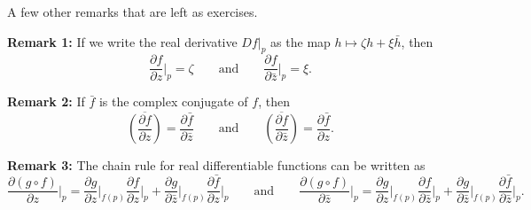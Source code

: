\documentclass[10pt,aspectratio=169]{beamer}
\begin{document}
\begin{frame}
A few other remarks that are left as exercises.

\medskip
\pause
\textbf{Remark 1:}
If we write the real derivative $Df|_p$ as the map $h \mapsto \zeta h + \xi \bar{h}$,
\pause
then
\[
\frac{\partial f}{\partial z}\big|_p = \zeta
\qquad \text{and} \qquad
\frac{\partial f}{\partial \bar{z}}\big|_p = \xi .
\]

\medskip
\pause
\textbf{Remark 2:}
If $\bar{f}$ is the complex conjugate of $f$, then
\pause
\[
\overline{\left(\frac{\partial f}{\partial z}\right)} = 
\frac{\partial \bar{f}}{\partial \bar{z}}
\qquad \text{and} \qquad
\overline{\left(\frac{\partial f}{\partial \bar{z}}\right)} = 
\frac{\partial \bar{f}}{\partial z} .
\]

\medskip
\pause
\textbf{Remark 3:} The chain rule for real differentiable functions
can be written as
\[
\frac{\partial (g \circ f)}{\partial z}\Big|_p
=
\frac{\partial g}{\partial z}\Big|_{f(p)}
\frac{\partial f}{\partial z}\Big|_p
+
\frac{\partial g}{\partial \bar{z}}\Big|_{f(p)}
\frac{\partial \bar{f}}{\partial z}\Big|_p
\qquad
\text{and}
\qquad
\frac{\partial (g \circ f)}{\partial \bar{z}}\Big|_p
=
\frac{\partial g}{\partial z}\Big|_{f(p)}
\frac{\partial f}{\partial \bar{z}}\Big|_p
+
\frac{\partial g}{\partial \bar{z}}\Big|_{f(p)}
\frac{\partial \bar{f}}{\partial \bar{z}}\Big|_p .
\]
\end{frame}
\end{document}
